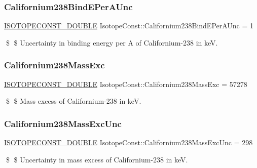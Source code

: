 \subsubsection{\texorpdfstring{Californium238\+Bind\+E\+Per\+A\+Unc}{Californium238BindEPerAUnc}}
{\footnotesize\ttfamily \mbox{\hyperlink{group___isotope_const-_macros_ga8f45a7272ce02c0b4c65c44636ed719a}{I\+S\+O\+T\+O\+P\+E\+C\+O\+N\+S\+T\+\_\+\+D\+O\+U\+B\+LE}} Isotope\+Const\+::\+Californium238\+Bind\+E\+Per\+A\+Unc = 1}

\$ \$ Uncertainty in binding energy per A of Californium-\/238 in keV. \mbox{\label{group___isotope_const-_californium-_cf238_gacb4cde21ecb7b6cfa87f2a3d672c09bf}} 
\subsubsection{\texorpdfstring{Californium238\+Mass\+Exc}{Californium238MassExc}}
{\footnotesize\ttfamily \mbox{\hyperlink{group___isotope_const-_macros_ga8f45a7272ce02c0b4c65c44636ed719a}{I\+S\+O\+T\+O\+P\+E\+C\+O\+N\+S\+T\+\_\+\+D\+O\+U\+B\+LE}} Isotope\+Const\+::\+Californium238\+Mass\+Exc = 57278}

\$ \$ Mass excess of Californium-\/238 in keV. \mbox{\label{group___isotope_const-_californium-_cf238_ga934c13d55d59bbf8ba1aae07549bc104}} 
\subsubsection{\texorpdfstring{Californium238\+Mass\+Exc\+Unc}{Californium238MassExcUnc}}
{\footnotesize\ttfamily \mbox{\hyperlink{group___isotope_const-_macros_ga8f45a7272ce02c0b4c65c44636ed719a}{I\+S\+O\+T\+O\+P\+E\+C\+O\+N\+S\+T\+\_\+\+D\+O\+U\+B\+LE}} Isotope\+Const\+::\+Californium238\+Mass\+Exc\+Unc = 298}

\$ \$ Uncertainty in mass excess of Californium-\/238 in keV. \mbox{\label{group___isotope_const-_californium-_cf238_ga54028d8e4a4bf790a658836a61b95500}} 
